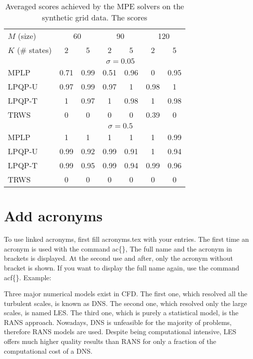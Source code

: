 \begin{table}[htb]
	\centering
	\begin{tabular}{l cc cc cc}
		\hline
		$M$ (size)  &  \multicolumn{2}{c}{60} &  \multicolumn{2}{c}{90} &  \multicolumn{2}{c}{120} \\
		$K$ (\# states)  &  2  &  5  &  2  & 5  &  2  & 5 \\
		\hline\hline
		& \multicolumn{6}{c}{$\sigma=0.05$} \\
		\cline{2-7}
		MPLP   &    0.71  &    0.99   &   0.51  &    0.96   &   0  &    0.95 \\
		LPQP-U   &    0.97  &    0.99   &   0.97  &    1   & 0.98  &    1 \\
		LPQP-T   &    1  &    0.97   &   1  &    0.98   & 1  &    0.98 \\
		TRWS   &    0  &    0   &   0  &    0   &   0.39  &    0\\
		\cline{2-7}
		& \multicolumn{6}{c}{$\sigma=0.5$}  \\
		\cline{2-7}
		MPLP   &    1  &    1   &   1  &    1   & 1  &    0.99\\
		LPQP-U   &    0.99  &    0.92   &   0.99  &    0.91   &   1  &    0.94\\
		LPQP-T   &    0.99  &    0.95   &   0.99  &    0.94   &   0.99  &    0.96\\
		TRWS   &    0  &    0   &   0  &    0   &   0  &    0\\
		\hline
	\end{tabular}	
	\caption[]{Averaged scores achieved by the MPE solvers on the synthetic grid data. 
		The scores}
	\label{tab:lpqp:grid}
\end{table}

\section{Add acronyms}
\label{sec:Add acronyms}
To use linked acronyms, first fill acronyms.tex with your entries. The first time an acronym is used with the command ac\{\}, The full name and the acronym in brackets is displayed. At the second use and after, only the acronym without bracket is shown. If you want to display the full name again, use the command acf\{\}. Example:
 
Three major numerical models exist in \ac{CFD}. The first one, which resolved all the turbulent scales, is known as \ac{DNS}. The second one, which resolved only the large scales, is named \ac{LES}. The third one, which is purely a statistical model, is the \ac{RANS} approach. Nowadays, \ac{DNS} is unfeasible for the majority of problems, therefore \ac{RANS} models are used. Despite being computational intensive, \ac{LES} offers much higher quality results than \acf{RANS} for only a fraction of the computational cost of a \ac{DNS}.

